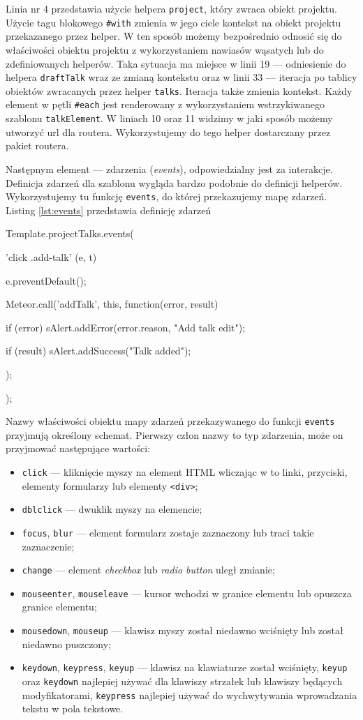 Linia nr 4 przedstawia użycie helpera \verb|project|, który zwraca obiekt projektu. Użycie tagu blokowego \verb|#with| zmienia w jego ciele kontekst na obiekt projektu przekazanego przez helper. W ten sposób możemy bezpośrednio odnosić się do właściwości obiektu projektu z wykorzystaniem nawiasów wąsatych lub do zdefiniowanych helperów. Taka sytuacja ma miejsce w linii 19 --- odniesienie do helpera \verb|draftTalk| wraz ze zmianą kontekstu oraz w linii 33 --- iteracja po tablicy obiektów zwracanych przez helper \verb|talks|. Iteracja także zmienia kontekst. Każdy element w pętli \verb|#each| jest renderowany z wykorzystaniem wstrzykiwanego szablonu \verb|talkElement|. W liniach 10 oraz 11 widzimy w jaki sposób możemy utworzyć url dla routera. Wykorzystujemy do tego helper dostarczany przez pakiet routera.

Następnym element --- zdarzenia (\emph{events}), odpowiedzialny jest za interakcje. Definicja zdarzeń dla szablonu wygląda bardzo podobnie do definicji helperów. Wykorzystujemy tu funkcję \verb|events|, do której przekazujemy mapę zdarzeń. Listing \ref{lst:events} przedstawia definicję zdarzeń 
\begin{js}[caption={Definicja zdarzeń},label={lst:events}]
Template.projectTalks.events({
    'click .add-talk' (e, t) {
        e.preventDefault();
        
        Meteor.call('addTalk', this, function(error, result) {
            if (error) {
                sAlert.addError(error.reason, "Add talk edit");
            }

            if (result) {
                sAlert.addSuccess("Talk added");
            }
        });
    }
});
\end{js}
Nazwy właściwości obiektu mapy zdarzeń przekazywanego do funkcji \verb|events| przyjmują określony schemat. Pierwszy człon nazwy to typ zdarzenia, może on przyjmować następujące wartości:
\begin{itemize}
 \item \verb|click| --- kliknięcie myszy na element HTML wliczając w to linki, przyciski, elementy formularzy lub elementy \verb|<div>|;
 \item \verb|dblclick| --- dwuklik myszy na elemencie;
 \item \verb|focus|, \verb|blur| --- element formularz zostaje zaznaczony lub traci takie zaznaczenie;
 \item \verb|change| --- element \textit{checkbox} lub \textit{radio button} uległ zmianie;
 \item \verb|mouseenter|, \verb|mouseleave| --- kursor wchodzi w granice elementu lub opuszcza granice elementu;
 \item \verb|mousedown|, \verb|mouseup| --- klawisz myszy został niedawno wciśnięty lub został niedawno puszczony;
 \item \verb|keydown|, \verb|keypress|, \verb|keyup| --- klawisz na klawiaturze został wciśnięty, \verb|keyup| oraz \verb|keydown| najlepiej używać dla klawiszy strzałek lub klawiszy będących modyfikatorami, \verb|keypress| najlepiej używać do wychwytywania wprowadzania tekstu w pola tekstowe. 
\end{itemize}

